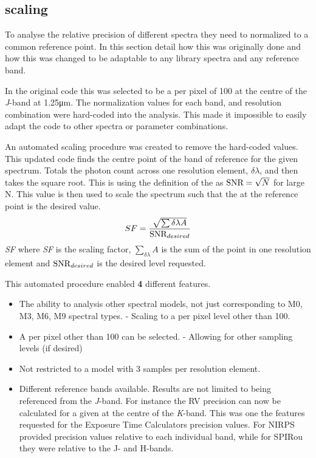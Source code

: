 \subsection{\snr{} scaling}
\label{subsec:snr_scaling}
To analyse the relative precision of different spectra they need to normalized to a common reference point.
In this section  detail how this was originally done and how this was changed to be adaptable to any library spectra and any reference band.

In the original code this was selected to be a \snr{} per pixel of 100 at the centre of the \textit{J}-band at 1.25\si{\micro\meter}.
The normalization values for each band, \Vsini{} and resolution combination were hard-coded into the analysis.
This made it impossible to easily adapt the code to other spectra or parameter combinations.

An automated \snr{} scaling procedure was created to remove the hard-coded values.
This updated code finds the centre point of the band of reference for the given spectrum.
Totals the photon count across one resolution element, \(\delta\lambda\), and then takes the square root.
This is using the definition of the \snr{} as \(\textrm{SNR}{} = \sqrt{N}\) for large N.
This value is then used to scale the spectrum such that the \snr{} at the reference point is the desired value.
\begin{equation}
    SF =  \frac{\sqrt{\sum{\delta\lambda} A}} {\textrm{SNR}{}_{desired}}
\end{equation}
\textit{SF} where \textit{SF} is the scaling factor, \(\sum_{\delta\lambda} A\) is the sum of the point in one resolution element and \({\textrm{SNR}{}}_{desired}\) is the desired \snr{} level requested.

This automated procedure enabled {\red{}\textbf{4}} different features.
\begin{itemize}
    \setlength\itemsep{-0.3em} %
    \item The ability to analysis other spectral models, not just corresponding to {M0}, {M3}, {M6}, {M9} spectral types.
    - Scaling to a \snr{} per pixel level other than 100.
    \item A \snr{} per pixel other than 100 can be selected.
    - Allowing for other sampling levels (if desired)
    \item Not restricted to a model with 3 samples per resolution element.
    \item Different reference bands available.
    Results are not limited to being referenced from the \textit{J}-band.
    For instance the {RV} precision can now be calculated for a given \snr{} at the centre of the \textit{K}-band.
    This was one the features requested for the Exposure Time Calculators precision values.
    For {NIRPS}  provided precision values relative to each individual band, while for {SPIRou} they were relative to the {J}- and {H}-bands.
\end{itemize}

